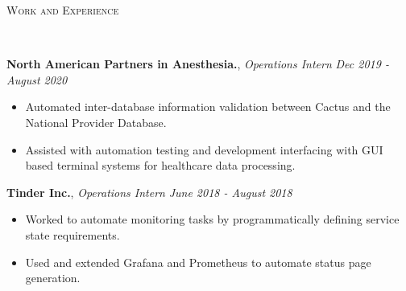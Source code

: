 \documentclass[9pt]{article}
\newenvironment{changemargin}[2]{%
  \begin{list}{}{%
    \setlength{\topsep}{0pt}%
    \setlength{\leftmargin}{#1}%
    \setlength{\rightmargin}{#2}%
    \setlength{\listparindent}{\parindent}%
    \setlength{\itemindent}{\parindent}%
    \setlength{\parsep}{\parskip}%
  }%
  \item[]}{\end{list}
}
\newcommand{\lineover}{
	\begin{changemargin}{-0.05in}{-0.05in}
		\vspace*{-8pt}
		\hrulefill \\
		\vspace*{-2pt}
	\end{changemargin}
}
\newcommand{\header}[1]{
	\begin{changemargin}{-0.5in}{-0.5in}
		\scshape{#1}\\
  	\lineover
	\end{changemargin}
}
\newenvironment{body} {
	\vspace*{-16pt}
	\begin{changemargin}{-0.25in}{-0.5in}
  }	
	{\end{changemargin}
}
\begin{document}
\header{Work and Experience}
\begin{body}
	\vspace{14pt}


	\textbf{North American Partners in Anesthesia.}, \emph{Operations Intern} \hfill
	\emph{Dec 2019 - August 2020}\\
	\vspace*{-3pt}
	\begin{itemize} \itemsep -0pt %
		\item Automated inter-database information validation between Cactus and the
		      National Provider Database.
		\item Assisted with automation testing and development interfacing with GUI based terminal
		      systems for healthcare data processing.
	\end{itemize}
	\vspace*{-2pt}

	\textbf{Tinder Inc.}, \emph{Operations Intern} \hfill \emph{June 2018 - August 2018}\\
	\vspace*{-3pt}
	\begin{itemize} \itemsep -0pt %
		\item Worked to automate monitoring tasks by programmatically defining service state requirements.
		\item Used and extended Grafana and Prometheus to automate status page generation.
	\end{itemize}
	\vspace*{-2pt}


\end{body}
\end{document}
